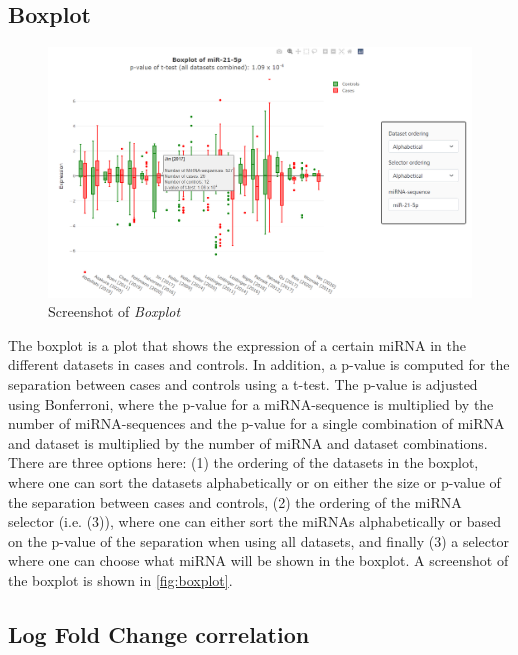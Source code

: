 {{{{{{{{{{{{{{{\subsection{Boxplot}

\begin{figure}
    \centering
    \includegraphics[width=\textwidth]{figs/webapp_screenshots/boxplot.png}
    \caption{Screenshot of \textit{Boxplot}}
    \label{fig:boxplot}
\end{figure}

The boxplot is a plot that shows the expression of a certain miRNA in the different datasets in cases and controls. In addition, a p-value is computed for the separation between cases and controls using a t-test. The p-value is adjusted using Bonferroni, where the p-value for a miRNA-sequence is multiplied by the number of miRNA-sequences and the p-value for a single combination of miRNA and dataset is multiplied by the number of miRNA and dataset combinations. There are three options here: (1) the ordering of the datasets in the boxplot, where one can sort the datasets alphabetically or on either the size or p-value of the separation between cases and controls, (2) the ordering of the miRNA selector (i.e. (3)), where one can either sort the miRNAs alphabetically or based on the p-value of the separation when using all datasets, and finally (3) a selector where one can choose what miRNA will be shown in the boxplot. A screenshot of the boxplot is shown in \autoref{fig:boxplot}.

\subsection{Log Fold Change correlation}

}}}}}}}}}}}}}}}

